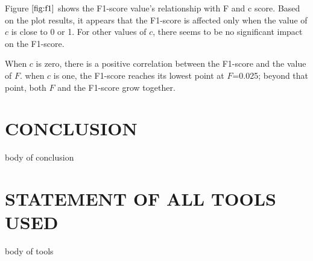 \documentclass{article}
\begin{document}
Figure $\ref{fig:f1}$ shows the F1-score value's relationship with F and c score.
Based on the plot results, it appears that the F1-score is affected only when the value of $c$ is close to 0 or 1. For other values of $c$, there seems to be no significant impact on the F1-score.

When $c$ is zero, there is a positive correlation between the F1-score and the value of $F$.
when $c$ is one, the F1-score reaches its lowest point at 
$F$=0.025; beyond that point, both $F$ and the F1-score grow together.

\section{CONCLUSION}
\label{sec:conclusion}

body of conclusion

\section{STATEMENT OF ALL TOOLS USED}
\label{sec:statementofalltoolsused}

body of tools




\vfill\pagebreak



\end{document}
